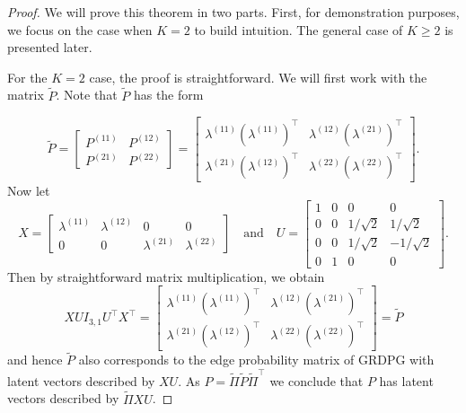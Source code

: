 \documentclass[
  11pt,
]{article}
\theoremstyle{definition}
\theoremstyle{definition}
\theoremstyle{definition}
\theoremstyle{definition}
\theoremstyle{remark}
\begin{document}
\begin{proof}
We will prove this theorem in two parts. First, for demonstration
purposes, we focus on the case when $K = 2$ to build intuition. 
The general case of $K \geq 2$ is presented later.  

For the $K = 2$ case, the proof is straightforward. We will first work with
the matrix $\tilde{P}$. Note that $\tilde{P}$ has the form

$$\tilde{P} = \begin{bmatrix} P^{(11)} & P^{(12)} \\ P^{(21)} &
  P^{(22)} \end{bmatrix} = \begin{bmatrix} \lambda^{(11)} (\lambda^{(11)})^\top & \lambda^{(12)} (\lambda^{(21)})^\top \\
  \lambda^{(21)} (\lambda^{(12)})^\top & \lambda^{(22)}
  (\lambda^{(22)})^\top \end{bmatrix}.$$
  Now let
$$X = \begin{bmatrix}
\lambda^{(11)} & \lambda^{(12)} & 0 & 0 \\
0 & 0 & \lambda^{(21)} & \lambda^{(22)}
\end{bmatrix} \quad \text{and} \quad
U = \begin{bmatrix} 1 & 0 & 0 & 0 \\
0 & 0 & 1 / \sqrt{2} & 1 / \sqrt{2} \\
0 & 0 & 1 / \sqrt{2} & - 1 / \sqrt{2} \\
0 & 1 & 0 & 0 \end{bmatrix}.$$
Then by straightforward matrix multiplication, we obtain 
$$X U I_{3, 1} U^\top X^\top =
\begin{bmatrix}
  \lambda^{(11)} (\lambda^{(11)})^\top & \lambda^{(12)} (\lambda^{(21)})^\top \\
  \lambda^{(21)} (\lambda^{(12)})^\top & \lambda^{(22)} (\lambda^{(22)})^\top
\end{bmatrix} = \tilde{P}$$
and hence $\tilde{P}$ also corresponds to the edge probability matrix of GRDPG
with latent vectors described by $X U$. As $P = \tilde{\Pi} \tilde{P}
\tilde{\Pi}^{\top}$ we conclude that $P$ has latent vectors described
by $\tilde{\Pi} X U$. 


\end{proof}
\end{document}
